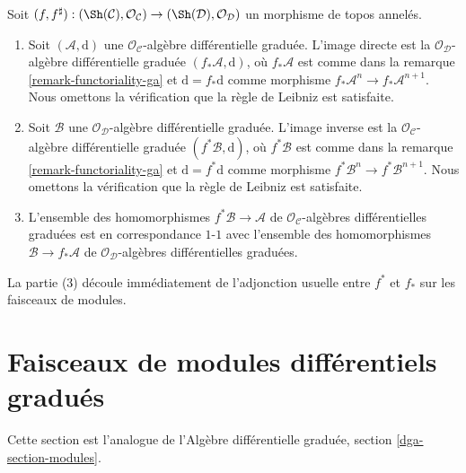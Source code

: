 \begin{remark}
\label{remark-functoriality-dga}
Soit $(f, f^\sharp) : (\Sh(\mathcal{C}), \mathcal{O}_\mathcal{C}) \to (\Sh(\mathcal{D}), \mathcal{O}_\mathcal{D})$ un morphisme de topos annelés.
\begin{enumerate}
\item Soit $(\mathcal{A}, \text{d})$ une $\mathcal{O}_\mathcal{C}$-algèbre différentielle graduée.
L'image directe est la $\mathcal{O}_\mathcal{D}$-algèbre différentielle graduée $(f_*\mathcal{A}, \text{d})$, où $f_*\mathcal{A}$ est comme dans la remarque \ref{remark-functoriality-ga} et $\text{d} = f_*\text{d}$ comme morphisme $f_*\mathcal{A}^n \to f_*\mathcal{A}^{n + 1}$.
Nous omettons la vérification que la règle de Leibniz est satisfaite.
\item Soit $\mathcal{B}$ une $\mathcal{O}_\mathcal{D}$-algèbre différentielle graduée.
L'image inverse est la $\mathcal{O}_\mathcal{C}$-algèbre différentielle graduée $(f^*\mathcal{B}, \text{d})$, où $f^*\mathcal{B}$ est comme dans la remarque \ref{remark-functoriality-ga} et $\text{d} = f^*\text{d}$ comme morphisme $f^*\mathcal{B}^n \to f^*\mathcal{B}^{n + 1}$.
Nous omettons la vérification que la règle de Leibniz est satisfaite.
\item L'ensemble des homomorphismes $f^*\mathcal{B} \to \mathcal{A}$ de $\mathcal{O}_\mathcal{C}$-algèbres différentielles graduées est en correspondance $1$-$1$ avec l'ensemble des homomorphismes $\mathcal{B} \to f_*\mathcal{A}$ de $\mathcal{O}_\mathcal{D}$-algèbres différentielles graduées.
\end{enumerate}
La partie (3) découle immédiatement de l'adjonction usuelle entre $f^*$ et $f_*$ sur les faisceaux de modules.
\end{remark}
















\section{Faisceaux de modules différentiels gradués}
\label{section-modules}

\noindent
Cette section est l'analogue de l'Algèbre différentielle graduée, section \ref{dga-section-modules}.

